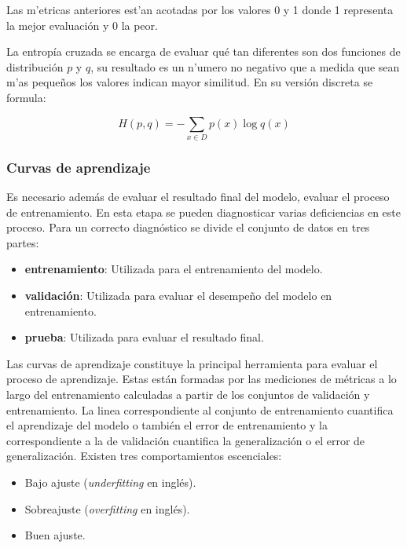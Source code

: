 Las m'etricas anteriores est'an acotadas por los valores 0 y 1 donde 1 representa la mejor evaluación y 0 la 
peor.

La entropía cruzada se encarga de evaluar qué tan diferentes son dos funciones de distribución $p$ y $q$, su 
resultado es un n'umero no negativo que a medida que sean m'as pequeños los valores indican mayor similitud. 
En su versión discreta se formula:

\begin{equation}
	H(p, q) = - \sum_{x \in D} p(x) \log q(x)
\end{equation}

\subsubsection{Curvas de aprendizaje}

Es necesario además de evaluar el resultado final del modelo, evaluar el proceso de entrenamiento. En esta etapa 
se pueden diagnosticar varias deficiencias en este proceso. Para un correcto diagnóstico se divide el conjunto de 
datos en tres partes:

\begin{itemize}
	\item \textbf{entrenamiento}: Utilizada para el entrenamiento del modelo.
	\item \textbf{validación}: Utilizada para evaluar el desempeño del modelo en entrenamiento.
	\item \textbf{prueba}: Utilizada para evaluar el resultado final.
\end{itemize}

Las curvas de aprendizaje constituye la principal herramienta para evaluar el proceso de aprendizaje.
Estas están formadas por las mediciones de métricas a lo largo del entrenamiento calculadas a partir de 
los conjuntos de validación y entrenamiento. La linea correspondiente al conjunto de entrenamiento cuantifica 
el aprendizaje del modelo o también el error de entrenamiento y la correspondiente a la de validación cuantifica 
la generalización o el error de generalización. Existen tres comportamientos escenciales:

\begin{itemize}
	\item Bajo ajuste (\emph{underfitting} en inglés).
	\item Sobreajuste (\emph{overfitting} en inglés).
	\item Buen ajuste.
\end{itemize}

